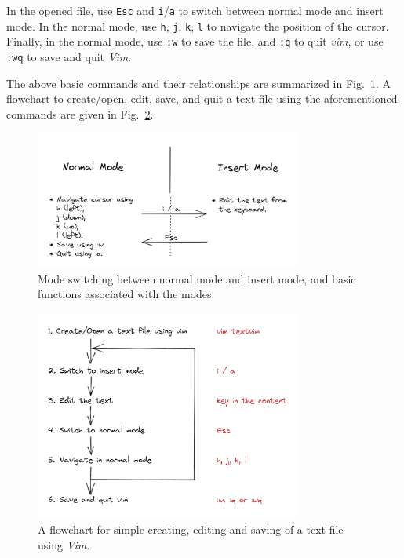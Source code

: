 In the opened file, use \verb|Esc| and \verb|i|/\verb|a| to switch between normal mode and insert mode. In the normal mode, use \verb|h|, \verb|j|, \verb|k|, \verb|l| to navigate the position of the cursor. Finally, in the normal mode, use \verb|:w| to save the file, and \verb|:q| to quit \textit{vim}, or use \verb|:wq| to save and quit \textit{Vim}.

The above basic commands and their relationships are summarized in Fig.~\ref{ch3fig:vimbasicmodeswitching}. A flowchart to create/open, edit, save, and quit a text file using the aforementioned commands are given in Fig.~\ref{ch3fig:vimbasicoperationflowchart}.

\begin{figure}
\centering
\includegraphics[width=250pt]{chapters/chapter3/figures/vimbasicmodeswitching.png}
\caption{Mode switching between normal mode and insert mode, and basic functions associated with the modes.} \label{ch3fig:vimbasicmodeswitching}
\end{figure}

\begin{figure}
\centering
\includegraphics[width=250pt]{chapters/chapter3/figures/vimbasicoperationflowchart.png}
\caption{A flowchart for simple creating, editing and saving of a text file using \textit{Vim}.} \label{ch3fig:vimbasicoperationflowchart}
\end{figure}

